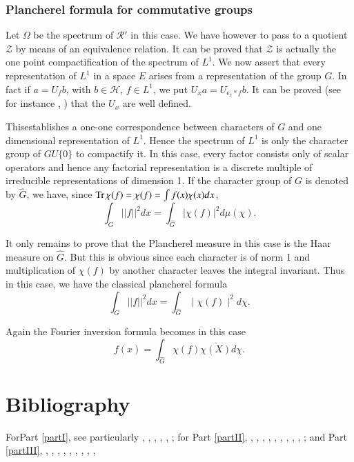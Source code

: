 \subsection{Plancherel formula for commutative
  groups}\label{partIII-chap3-sec3.7}%
  
Let $\Omega$ be the spectrum of $\mathscr{R}'$ in this case. We have
however to pass to a quotient $\mathcal{Z}$ by means of an equivalence
relation. It can be proved that $\mathcal{Z}$ is actually the one
point compactification of the spectrum of $L^1$. We now assert that
every representation of $L^1$ in a space $E$ arises from a  
 representation of the group $G$. In fact if $a=U_f b$, with $b \in
 \mathscr{H}$, $f \in L^1$, we put $U_x a=U_{\epsilon_x * f} b$.
It can be proved (see for instance \cite{key22}, \cite{key6}) that the
$U_x$ are well defined.   

This\pageoriginale establishes a one-one correspondence between
characters of $G$ 
and one dimensional representation of $L^1$. Hence the spectrum of
$L^1$ is only the character group of $GU \{ 0 \}$ to compactify it. In
this case, every factor consists only of scalar operators and hence any
factorial representation is a discrete multiple of irreducible
representations of dimension 1. If the character group of $G$ is denoted by
$\hat{G}$, we have, since $\operatorname{Tr} \chi (f) =\chi (f) =\int f(x) \chi (x)
dx$, 
$$
\int_G || f ||^2 dx =\int_{\hat{G}}|\chi(f) |^2 d\mu(\chi).  
$$

It only remains to prove that the Plancherel measure in this case is
the Haar measure on $\hat{G}$. But this is obvious since each
character is of norm 1 and multiplication of $\chi(f)$ by another
character leaves the integral invariant. Thus in this case, we have
the  classical plancherel formula 
$$
\int_G || f ||^2 dx =\int_{\hat{G}} \mid \chi (f) \mid^2 d\chi.
$$
 
Again the Fourier inversion formula becomes in this case
$$
f(x)=\int_{\hat{G}} \chi (f) \overline{\chi(X)} d \chi.
$$


\backmatter

\chapter{Bibliography}

For\pageoriginale Part \ref{partI}, see particularly \cite{key3},
\cite{key8}, \cite{key9}, 
\cite{key10}, \cite{key43}, \cite{key49};
for Part \ref{partII}, \cite{key4}, \cite{key5}, \cite{key6}, \cite{key7},
\cite{key19}, \cite{key22}, \cite{key29}, \cite{key31},
\cite{key44}, \cite{key49}; and Part \ref{partIII}, \cite{key12}, \cite{key20},
\cite{key23}, \cite{key33}, \cite{key34},
\cite{key36}, \cite{key40}, \cite{key46}, \cite{key47},


